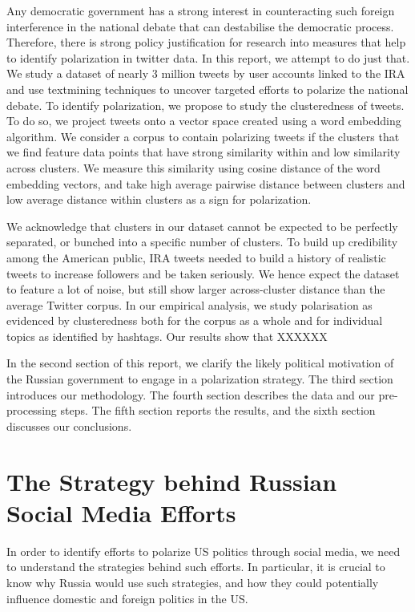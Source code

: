 \documentclass[12pt, authoryear]{elsarticle}
\begin{document}
Any democratic government has a strong interest in counteracting such foreign interference in the national debate that can destabilise the democratic process. Therefore, there is strong policy justification for research into measures that help to identify polarization in twitter data. In this report, we attempt to do just that. We study a dataset of nearly 3 million tweets by user accounts linked to the IRA and use textmining techniques to uncover targeted efforts to polarize the national debate. To identify polarization, we propose to study the clusteredness of tweets. To do so, we project tweets onto a vector space created using a word embedding algorithm. We consider a corpus to contain polarizing tweets if the clusters that we find feature data points that have strong similarity within and low similarity across clusters. We measure this similarity using cosine distance of the word embedding vectors, and take high average pairwise distance between clusters and low average distance within clusters as a sign for polarization.

We acknowledge that clusters in our dataset cannot be expected to be perfectly separated, or bunched into a specific number of clusters. To build up credibility among the American public, IRA tweets needed to build a history of realistic tweets to increase followers and be taken seriously. We hence expect the dataset to feature a lot of noise, but still show larger across-cluster distance than the average Twitter corpus. In our empirical analysis, we study polarisation as evidenced by clusteredness both for the corpus as a whole and for individual topics as identified by hashtags. Our results show that XXXXXX

In the second section of this report, we clarify the likely political motivation of the Russian government to engage in a polarization strategy. The third section introduces our methodology. The fourth section describes the data and our pre-processing steps. The fifth section reports the results, and the sixth section discusses our conclusions.

\section{The Strategy behind Russian Social Media Efforts}\label{literature}

In order to identify efforts to polarize US politics through social media, we need to understand the strategies behind such efforts. In particular, it is crucial to know why Russia would use such strategies, and how they could potentially influence domestic and foreign politics in the US. 
\end{document}
